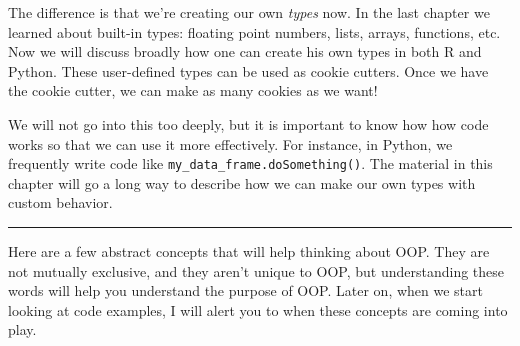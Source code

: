 \documentclass[
  12pt,
  krantz2]{krantz}
\begin{document}
The difference is that we're creating our own \emph{types} now. In the last chapter we learned about built-in types: floating point numbers, lists, arrays, functions, etc. Now we will discuss broadly how one can create his own types in both R and Python. These user-defined types can be used as cookie cutters. Once we have the cookie cutter, we can make as many cookies as we want!

We will not go into this too deeply, but it is important to know how how code works so that we can use it more effectively. For instance, in Python, we frequently write code like \texttt{my\_data\_frame.doSomething()}. The material in this chapter will go a long way to describe how we can make our own types with custom behavior.

\begin{center}\rule{0.5\linewidth}{0.5pt}\end{center}

Here are a few abstract concepts that will help thinking about OOP. They are not mutually exclusive, and they aren't unique to OOP, but understanding these words will help you understand the purpose of OOP. Later on, when we start looking at code examples, I will alert you to when these concepts are coming into play.
\end{document}
